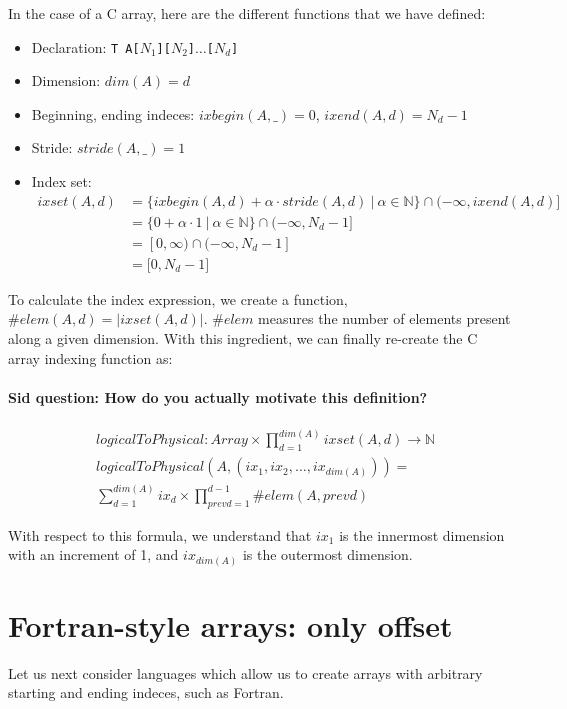 \documentclass{article}
\newcommand{\naturals}{\mathbb{N}}
\begin{document}
In the case of a C array, here are the different functions that we have defined:
\begin{itemize}
    \renewcommand\labelitemi{--}
    \item Declaration: \texttt{T A[$N_1$][$N_2$]$\dots$[$N_d$]}
    \item Dimension: $dim(A) = d$
    \item Beginning, ending indeces: $ixbegin(A, \_) = 0$, $ixend(A, d) = N_d - 1$
    \item Stride: $stride(A, \_) = 1$
    \item Index set: 
        \begin{align*}
            ixset(A, d) &= \{ ixbegin(A, d) + \alpha \cdot stride(A, d)~\vert~ \alpha \in \naturals \} \cap (-\infty, ixend(A, d) ] \\
                        &= \{ 0 + \alpha \cdot 1~\vert~\alpha \in \naturals \} \cap (-\infty, N_d - 1 \rbrack \\
                        &= [0, \infty) \cap (-\infty, N_d - 1]\\
                        &= \lbrack 0, N_d - 1 \rbrack
        \end{align*}
\end{itemize}

To calculate the index expression, we create a function, $\#elem(A, d) = |ixset(A, d)|$. 
$\#elem$ measures the number of elements present along a given dimension.
With this ingredient, we can finally re-create the C array indexing function as:

\paragraph{Sid question: How do you actually \textbf{motivate} this definition?}

\begin{align*}
    &logicalToPhysical: Array \times \prod_{d=1}^{dim(A)} ixset(A, d) \to \naturals \\
    &logicalToPhysical(A, (ix_1, ix_2, \dots, ix_{dim(A)})) = \\
    &\sum_{d=1}^{dim(A)} ix_d \times \prod_{prevd=1}^{d - 1} \#elem(A, prevd)
\end{align*}

With respect to this formula, we understand that $ix_1$ is the innermost dimension
with an increment of 1, and $ix_{dim(A)}$ is the outermost dimension.
\section{Fortran-style arrays: only offset}
Let us next consider languages which allow us to create arrays with arbitrary
starting and ending indeces, such as Fortran.
\end{document}

